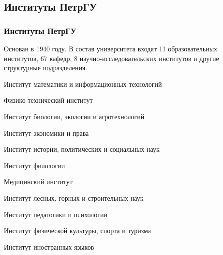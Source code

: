 \subsection{Институты ПетрГУ}

\begin{frame} 
\frametitle{Институты ПетрГУ} {\scriptsize
Основан в 1940 году. В состав университета входят 11 образовательных институтов, 67 кафедр, 8 научно-исследовательских институтов и другие структурные подразделения.}\\
\vspace{0.01\textheight}
\begin{itemize} {\scriptsize
    \item Институт математики и информационных технологий
    \vspace{0.01\textheight}
    \item Физико-технический институт
    \vspace{0.01\textheight}
    \item Институт биологии, экологии и агротехнологий
    \vspace{0.01\textheight}
    \item Институт экономики и права
    \vspace{0.01\textheight}
    \item Институт истории, политических и социальных наук
    \vspace{0.01\textheight}
    \item Институт филологии
    \vspace{0.01\textheight}
    \item Медицинский институт
    \vspace{0.01\textheight}
    \item Институт лесных, горных и строительных наук
    \vspace{0.01\textheight}
    \item Институт педагогики и психологии
    \vspace{0.01\textheight}
    \item Институт физической культуры, спорта и туризма
    \vspace{0.01\textheight}
    \item Институт иностранных языков
    \vspace{0.01\textheight}
    
    }
\end{itemize}

\end{frame}